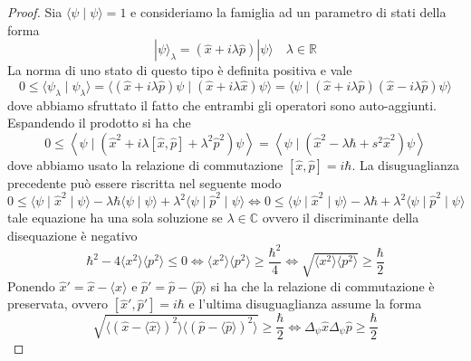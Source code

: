 \begin{proof}
	Sia $\langle \psi \;|\; \psi \rangle = 1 $ e consideriamo la famiglia ad un parametro di stati della forma 
	\begin{equation*}
		|\psi \rangle_{\lambda} = (\hat{x} + i \lambda \hat{p})|\psi \rangle \quad \lambda \in \mathbb{R}  
	\end{equation*}
	La norma di uno stato di questo tipo \`e definita positiva e vale 
	\begin{equation*}
		 0 \leq  \langle \psi_{\lambda} \; | \; \psi_{\lambda} \rangle  = \langle(\hat{x}+i \lambda  \hat{p}) \psi \mid(\hat{x}+i \lambda \hat{x}) \psi\rangle=\langle\psi \mid(\hat{x}+i \lambda \hat{p})(\hat{x}-i \lambda \hat{p}) \psi\rangle
	\end{equation*}
dove abbiamo sfruttato il fatto che entrambi gli operatori sono auto-aggiunti. Espandendo il prodotto si ha che 
\begin{equation*}
	0 \leq\left\langle\psi \mid\left(\hat{x}^2+i \lambda [\hat{x}, \hat{p}]+\lambda^2 \hat{p}^2\right) \psi\right\rangle=\left\langle\psi \mid\left(\hat{x}^2- \lambda  \hbar+s^2 \hat{x}^2\right) \psi\right\rangle
\end{equation*}
dove abbiamo usato la relazione di commutazione $[\hat{x},\hat{p}] = i \hbar $. La disuguaglianza precedente pu\`o essere riscritta nel seguente modo
\begin{equation*}
	0 \leq \langle \psi \mid \hat{x}^2 \mid \psi \rangle - \lambda \hbar \langle \psi \mid \psi \rangle + \lambda^2 \langle \psi \mid \hat{p}^2 \mid \psi \rangle  \iff 0 \leq \langle \psi \mid \hat{x}^2 \mid \psi \rangle - \lambda \hbar  + \lambda^2 \langle \psi \mid \hat{p}^2 \mid \psi \rangle
\end{equation*}
tale equazione ha una sola soluzione se $\lambda \in \mathbb{C}$ ovvero il discriminante della disequazione \`e negativo
\begin{equation*}
	\hbar^2 - 4 \langle x^2 \rangle \langle p^2 \rangle  \leq 0 \iff \langle x^2 \rangle \langle p^2 \rangle \geq \frac{\hbar^2}{4} \iff \sqrt{\langle x^2 \rangle \langle p^2 \rangle} \geq \frac{\hbar}{2}
\end{equation*}
Ponendo $\hat{x}' = \hat{x} - \langle \hat{x}\rangle $ e $\hat{p}' = \hat{p} -\langle \hat{p} \rangle $ si ha che la relazione di commutazione \`e preservata, ovvero $[\hat{x}',\hat{p}'] = i \hbar $ e l'ultima disuguaglianza assume la forma 
\begin{equation*}
	\sqrt{\langle (\hat{x} - \langle \hat{x} \rangle )^2 \rangle \langle (\hat{p} - \langle \hat{p} \rangle )^2 \rangle } \geq \frac{\hbar }{2} \iff \Delta_{\psi}\hat{x}\Delta_{\psi}\hat{p} \geq \frac{\hbar}{2}
\end{equation*}
\end{proof}

